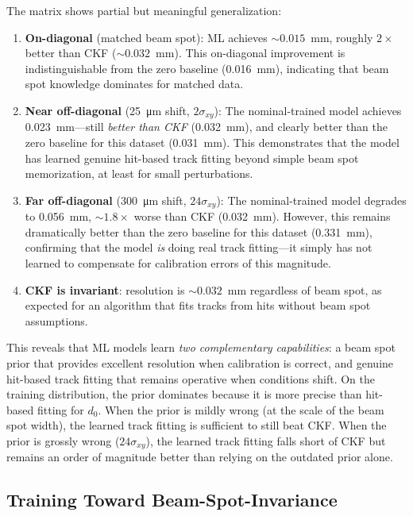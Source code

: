 \documentclass[11pt]{article}
\begin{document}
The matrix shows partial but meaningful generalization:
\begin{enumerate}
    \item \textbf{On-diagonal} (matched beam spot): ML achieves ${\sim}0.015$~mm, roughly $2\times$ better than CKF (${\sim}0.032$~mm). This on-diagonal improvement is indistinguishable from the zero baseline (\SI{0.016}{\milli\metre}), indicating that beam spot knowledge dominates for matched data.
    \item \textbf{Near off-diagonal} (\SI{25}{\micro\metre} shift, $2\sigma_{xy}$): The nominal-trained model achieves \SI{0.023}{\milli\metre}---still \emph{better than CKF} (\SI{0.032}{\milli\metre}), and clearly better than the zero baseline for this dataset (\SI{0.031}{\milli\metre}). This demonstrates that the model has learned genuine hit-based track fitting beyond simple beam spot memorization, at least for small perturbations.
    \item \textbf{Far off-diagonal} (\SI{300}{\micro\metre} shift, $24\sigma_{xy}$): The nominal-trained model degrades to \SI{0.056}{\milli\metre}, $\sim 1.8\times$ worse than CKF (\SI{0.032}{\milli\metre}). However, this remains dramatically better than the zero baseline for this dataset (\SI{0.331}{\milli\metre}), confirming that the model \emph{is} doing real track fitting---it simply has not learned to compensate for calibration errors of this magnitude.
    \item \textbf{CKF is invariant}: resolution is ${\sim}0.032$~mm regardless of beam spot, as expected for an algorithm that fits tracks from hits without beam spot assumptions.
\end{enumerate}

This reveals that ML models learn \emph{two complementary capabilities}: a beam spot prior that provides excellent resolution when calibration is correct, and genuine hit-based track fitting that remains operative when conditions shift.
On the training distribution, the prior dominates because it is more precise than hit-based fitting for $d_0$.
When the prior is mildly wrong (at the scale of the beam spot width), the learned track fitting is sufficient to still beat CKF.
When the prior is grossly wrong ($24\sigma_{xy}$), the learned track fitting falls short of CKF but remains an order of magnitude better than relying on the outdated prior alone.

\subsection{Training Toward Beam-Spot-Invariance}
\label{sec:randomized}
\end{document}
